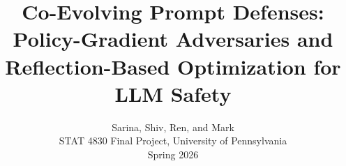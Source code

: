 \newcommand{\asr}{\mathrm{ASR}}
\newcommand{\orate}{\mathrm{OR}}
\newcommand{\harmbench}{\textsc{HarmBench}}
\newcommand{\xstest}{\textsc{XSTest}}
\newcommand{\pair}{\textsc{PAIR}}
\newcommand{\rloo}{\textsc{RLOO}}
\newcommand{\reinforce}{\textsc{REINFORCE}}
\newcommand{\gepa}{\textsc{GEPA}}
\newcommand{\lp}{\textsc{LP}}
\newcommand{\figbox}[2]{%
\begin{center}
\fcolorbox{black!35}{black!4}{%
\begin{minipage}[c][#1][c]{0.92\linewidth}
\centering \small #2
\end{minipage}}
\end{center}
}
\newcommand{\examplebox}[1]{%
\begin{center}
\fcolorbox{black!35}{black!4}{%
\begin{minipage}{0.94\linewidth}
\small #1
\end{minipage}}
\end{center}
}


\title{\vspace{-1.5em}
Co-Evolving Prompt Defenses:\\
Policy-Gradient Adversaries and Reflection-Based Optimization for LLM Safety
}

\author{
\begin{tabular}{c}
Sarina, Shiv, Ren, and Mark\\
STAT 4830 Final Project, University of Pennsylvania\\
Spring 2026
\end{tabular}
}

\date{}


\maketitle


